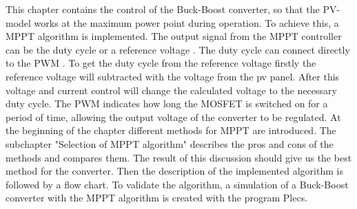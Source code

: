 This chapter contains the control of the Buck-Boost converter, so that the PV-model works at the maximum power point during operation. To achieve this, a MPPT algorithm is implemented. The output signal from the MPPT controller can be the duty cycle or a reference voltage . The duty cycle can connect directly to the PWM . To get the duty cycle from the reference voltage firstly the reference voltage will subtracted with the voltage from the pv panel. After this voltage and current control will change the calculated voltage to the necessary duty cycle. The PWM indicates how long the MOSFET is switched on for a period of time, allowing the output voltage of the converter to be regulated.
At the beginning of the chapter different methods for MPPT are introduced. The subchapter "Selection of MPPT algorithm" describes the pros and cons of the methods and compares them. The result of this discussion should give us the best method for the converter. Then the description of the implemented algorithm is followed by a flow chart. To validate the algorithm, a simulation of a Buck-Boost converter with the MPPT algorithm is created with the program Plecs.
